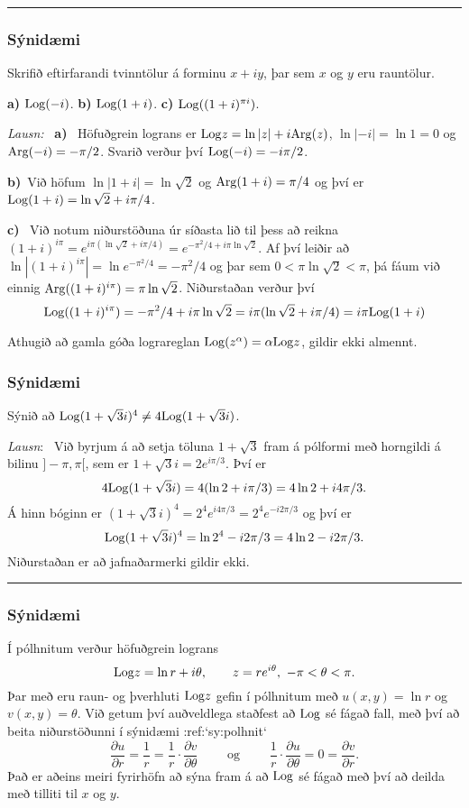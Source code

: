 \bigskip\hrule\bigskip

\subsubsection{Sýnidæmi}
Skrifið eftirfarandi  tvinntölur á forminu $x+iy$, þar sem 
$x$ og $y$ eru rauntölur.

\smallskip\noindent
{\bf a)} \quad  ${\operatorname{Log}}{(-i)}$. \qquad 
{\bf b)} \quad  ${\operatorname{Log}}({1+i})$. \qquad 
{\bf c)} \quad  ${\operatorname{Log}}((1+i)^{\pi i})$. 


\smallskip\noindent
{\it Lausn:} \   {\bf a)} \ Höfuðgrein lograns
er ${\operatorname{Log}} z=\ln |z|+i {\operatorname{Arg}}(z)$, $\ln|-i|=\ln 1=0$ og 
${\operatorname{Arg}}(-i)=-\pi/2$.  Svarið verður því ${\operatorname{Log}}(-i)=-i\pi/2$.

\smallskip\noindent
{\bf b)}\  Við höfum  $\ln|1+i|=\ln\sqrt 2$ og ${\operatorname{Arg}}(1+i)=\pi/4$
og því er ${\operatorname{Log}}(1+i)=\ln \sqrt 2+i\pi/4$.

\smallskip\noindent
{\bf c)} \  Við notum niðurstöðuna úr síðasta lið til þess að
reikna $(1+i)^{i\pi}=e^{i\pi(\ln\sqrt 2+i\pi/4)}=e^{-\pi^2/4+i\pi
\ln\sqrt 2}$.  Af því leiðir að $\ln|(1+i)^{i\pi}|=\ln
e^{-\pi^2/4}=-\pi^2/4$ og þar sem $0<\pi\ln \sqrt 2<\pi$, þá fáum við einnig
${\operatorname{Arg}}((1+i)^{i\pi})=\pi\ln\sqrt 2$.  Niðurstaðan verður því 
$$
{\operatorname{Log}}((1+i)^{i\pi})=-\pi^2/4+i\pi\ln\sqrt 2=i\pi(\ln\sqrt
2+i\pi/4)=i\pi{\operatorname{Log}}(1+i)
$$


\smallskip
Athugið að gamla góða lograreglan ${\operatorname{Log}} (z^\alpha)=\alpha {\operatorname{Log}} z$, gildir
ekki almennt.

\smallskip

\subsubsection{Sýnidæmi}  Sýnið að ${\operatorname{Log}}(1+\sqrt 3 i)^4\neq 4 {\operatorname{Log}}(1+\sqrt 3 i)$.


\smallskip\noindent
{\it Lausn}: \  Við byrjum á að setja töluna $1+\sqrt 3$ fram á
pólformi með horngildi á bilinu $]-\pi,\pi[$, sem er
$1+\sqrt 3 i=2e^{i{\pi}/3}$.  Því er
$$
4{\operatorname{Log}} (1+\sqrt 3 i)=4(\ln 2+i{\pi}/3)=4\ln 2+i4{\pi}/3.
$$
Á hinn bóginn er
$(1+\sqrt 3 i)^4=2^4e^{i4{\pi}/3}=
2^4e^{-i2{\pi}/3}$ og því er
$$
{\operatorname{Log}} (1+\sqrt 3 i)^4=\ln 2^4-i2{\pi}/3=4\ln 2-i2{\pi}/3.
$$
Niðurstaðan er að jafnaðarmerki gildir ekki. 




\bigskip\hrule\bigskip

\subsubsection{Sýnidæmi}
Í pólhnitum verður höfuðgrein lograns
$$
\Log z =\ln r+i\theta,  \qquad z=re^{i\theta}, \ -\pi<\theta<\pi.
$$
Þar með eru raun- og þverhluti ${\operatorname{Log}} z$ gefin í pólhnitum með
$u(x,y)=\ln r$ og $v(x,y)=\theta$. Við getum því auðveldlega
staðfest að ${\operatorname{Log}}$ sé fágað fall, með því að beita niðurstöðunni 
í sýnidæmi :ref:`sy:polhnit`
$$
\dfrac{\partial u}{\partial r}=\dfrac 1r=\dfrac 1r\cdot \dfrac 
{\partial v}{\partial \theta}\qquad \text{ og } \qquad
\dfrac 1r\cdot \dfrac{\partial u}{\partial \theta}=0=\dfrac {\partial
v}{\partial r}.
$$
Það er aðeins meiri fyrirhöfn að sýna fram
á að ${\operatorname{Log}}$ sé fágað með því að deilda með tilliti til $x$ og $y$.


